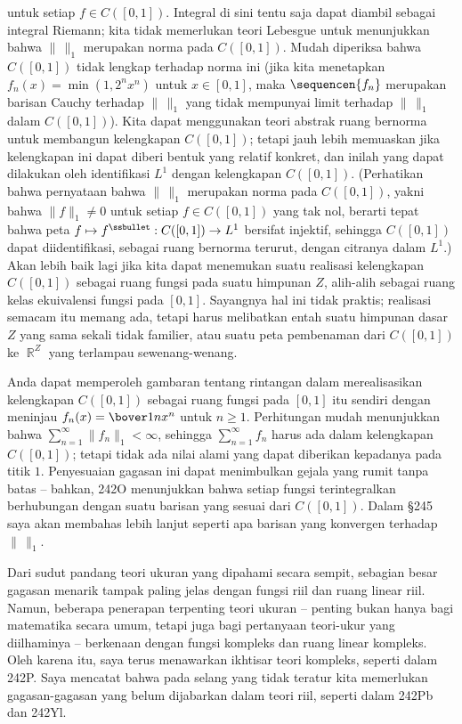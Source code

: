 {\noindent untuk setiap $f\in C([0,1])$. Integral di sini tentu saja dapat
diambil sebagai integral Riemann; kita tidak memerlukan teori Lebesgue untuk
menunjukkan bahwa $\|\,\|_1$ merupakan norma pada $C([0,1])$. Mudah
diperiksa bahwa $C([0,1])$ tidak lengkap terhadap norma ini (jika kita
menetapkan $f_n(x)=\min(1,2^nx^n)$ untuk $x\in[0,1]$, maka
$\sequencen{f_n}$ merupakan barisan Cauchy terhadap $\|\,\|_1$ yang tidak
mempunyai limit terhadap $\|\,\|_1$ dalam $C([0,1])$). Kita dapat
menggunakan teori abstrak ruang bernorma untuk membangun kelengkapan
$C([0,1])$; tetapi jauh lebih memuaskan jika kelengkapan ini dapat diberi
bentuk yang relatif konkret, dan inilah yang dapat dilakukan oleh
identifikasi $L^1$ dengan kelengkapan $C([0,1])$. (Perhatikan bahwa
pernyataan bahwa $\|\,\|_1$ merupakan norma pada $C([0,1])$, yakni bahwa
$\|f\|_1\ne 0$ untuk setiap $f\in C([0,1])$ yang tak nol, berarti tepat
bahwa peta $f\mapsto f^{\ssbullet}:C([0,1])\to L^1$ bersifat injektif,
sehingga $C([0,1])$ dapat diidentifikasi, sebagai ruang bernorma terurut,
dengan citranya dalam $L^1$.) Akan lebih baik lagi jika kita dapat menemukan
suatu realisasi kelengkapan $C([0,1])$ sebagai ruang fungsi pada suatu
himpunan $Z$, alih-alih sebagai ruang kelas ekuivalensi fungsi pada $[0,1]$.
Sayangnya hal ini tidak praktis; realisasi semacam itu memang ada, tetapi
harus melibatkan entah suatu himpunan dasar $Z$ yang sama sekali tidak
familier, atau suatu peta pembenaman dari $C([0,1])$ ke $\BbbR^Z$ yang
terlampau sewenang-wenang.

Anda dapat memperoleh gambaran tentang rintangan dalam merealisasikan
kelengkapan $C([0,1])$ sebagai ruang fungsi pada $[0,1]$ itu sendiri dengan
meninjau $f_n(x)=\bover1nx^n$ untuk $n\ge 1$. Perhitungan mudah menunjukkan
bahwa $\sum_{n=1}^{\infty}\|f_n\|_1<\infty$, sehingga
$\sum_{n=1}^{\infty}f_n$ harus ada dalam kelengkapan $C([0,1])$; tetapi tidak
ada nilai alami yang dapat diberikan kepadanya pada titik $1$. Penyesuaian
gagasan ini dapat menimbulkan gejala yang rumit tanpa batas -- bahkan, 242O
menunjukkan bahwa setiap fungsi terintegralkan berhubungan dengan suatu
barisan yang sesuai dari $C([0,1])$. Dalam \S245 saya akan membahas lebih
lanjut seperti apa barisan yang konvergen terhadap $\|\,\|_1$.

Dari sudut pandang teori ukuran yang dipahami secara sempit, sebagian besar
gagasan menarik tampak paling jelas dengan fungsi riil dan ruang linear riil.
Namun, beberapa penerapan terpenting teori ukuran -- penting bukan hanya bagi
matematika secara umum, tetapi juga bagi pertanyaan teori-ukur yang
diilhaminya -- berkenaan dengan fungsi kompleks dan ruang linear kompleks.
Oleh karena itu, saya terus menawarkan ikhtisar teori kompleks, seperti dalam
242P. Saya mencatat bahwa pada selang yang tidak teratur kita memerlukan
gagasan-gagasan yang belum dijabarkan dalam teori riil, seperti dalam 242Pb
dan 242Yl.
}%


\discrpage
